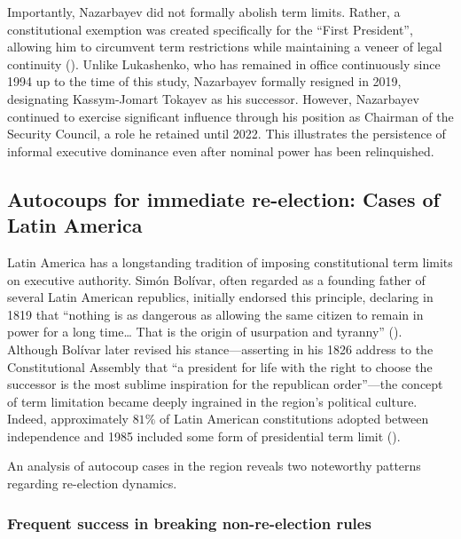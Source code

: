 \documentclass[
  12pt,
]{report}
\begin{document}
Importantly, Nazarbayev did not formally abolish term limits. Rather, a
constitutional exemption was created specifically for the ``First
President'', allowing him to circumvent term restrictions while
maintaining a veneer of legal continuity
(). Unlike
Lukashenko, who has remained in office continuously since 1994 up to the
time of this study, Nazarbayev formally resigned in 2019, designating
Kassym-Jomart Tokayev as his successor. However, Nazarbayev continued to
exercise significant influence through his position as Chairman of the
Security Council, a role he retained until 2022. This illustrates the
persistence of informal executive dominance even after nominal power has
been relinquished.

\subsection*{Autocoups for immediate re-election: Cases of Latin
America}\label{autocoups-for-immediate-re-election-cases-of-latin-america}

Latin America has a longstanding tradition of imposing constitutional
term limits on executive authority. Simón Bolívar, often regarded as a
founding father of several Latin American republics, initially endorsed
this principle, declaring in 1819 that ``nothing is as dangerous as
allowing the same citizen to remain in power for a long time\ldots{}
That is the origin of usurpation and tyranny''
(). Although
Bolívar later revised his stance---asserting in his 1826 address to the
Constitutional Assembly that ``a president for life with the right to
choose the successor is the most sublime inspiration for the republican
order''---the concept of term limitation became deeply ingrained in the
region's political culture. Indeed, approximately \(81\%\) of Latin
American constitutions adopted between independence and 1985 included
some form of presidential term limit
().

An analysis of autocoup cases in the region reveals two noteworthy
patterns regarding re-election dynamics.

\subsubsection*{Frequent success in breaking non-re-election
rules}\label{frequent-success-in-breaking-non-re-election-rules}
\end{document}
